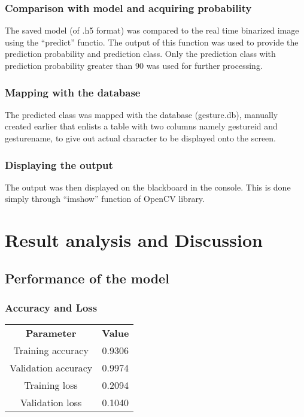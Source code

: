 \documentclass[fleqn, 11pt, twoside]{IOEGC}
\begin{document}
    \subsubsection{Comparison with model and acquiring probability}
    The saved model (of .h5 format) was compared to the real time binarized image using the “predict” functio. The output of this function was used to provide the prediction probability and prediction class. Only the prediction class with prediction probability greater than 90 was used for further processing.
    
    \subsubsection{Mapping with the database}
    The predicted class was mapped with the database (gesture.db), manually created earlier that enlists a table with two columns namely gesture\textunderscore id and gesture\textunderscore name, to give out actual character to be displayed onto the screen. 
    \subsubsection{Displaying the output}
    The output was then displayed on the blackboard in the console. This is done simply through “imshow” function of OpenCV library.

\section{Result analysis and Discussion}
    \subsection{Performance of the model}
        \subsubsection{Accuracy and Loss}
                \begin{center}
                    \begin{tabular}{ |c|c| }
                     \textbf{Parameter} & \textbf{Value}   \\ 
                     Training accuracy & 0.9306  \\  
                     Validation accuracy & 0.9974 \\
                     Training loss & 0.2094 \\
                     Validation loss & 0.1040 \\
                    \end{tabular}
                \end{center}
        
\end{document}
